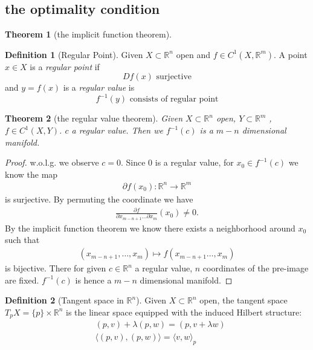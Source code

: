 \documentclass[a4paper,11pt,fleqn, draft]{book}
\newtheorem{theorem}{Theorem}[section]
\theoremstyle{definition}
\newtheorem{definition}{Definition}[section]
\theoremstyle{remark}
\begin{document}
\subsection{the optimality condition}
\begin{theorem}[the implicit function theorem]
\end{theorem}

\begin{definition}[Regular Point]
	Given $X \subset \mathbb{R}^n$ open and $f \in C^1 (X, \mathbb{R}^m)$. A point $x \in X$ is a \textit{regular point} if 
	\begin{equation*}
		D f(x)  \text{ surjective}
	\end{equation*}
	and $y = f(x)$ is a \textit{regular value} is 
	\begin{equation*}
		f^{-1}(y) \text{ consists of regular point}
	\end{equation*}
\end{definition}

\begin{theorem}[the regular value theorem]
	Given $X \subset \mathbb{R}^n$ open, $Y \subset \mathbb{R}^m$ , $f \in C^1(X, Y)$. $c$ a regular value. Then we $f^{-1}(c)$ is a $m - n$ dimensional manifold. 
\end{theorem}
\begin{proof}
	w.o.l.g. we observe $c = 0$. Since $0$ is a regular value, for $x_0 \in f^{-1}(c)$ we know the map
	\begin{align*}
		\partial f(x_0): \mathbb{R}^n \rightarrow \mathbb{R}^m
	\end{align*}
	is surjective. By permuting the coordinate we have 
	\begin{align*}
		\frac{\partial f}{\partial x_{m - n + 1} \dots \partial x_m}(x_0) \neq 0. 
	\end{align*}
	By the implicit function theorem we know there exists a neighborhood around $x_0$ such that
	\begin{align*}
		(x_{m - n + 1}, \dots, x_m) \mapsto f(x_{m-n+1} \dots, x_m)
	\end{align*}
	is bijective. There for given $c \in \mathbb{R}^n$ a regular value, $n$ coordinates of the pre-image are fixed. $f^{-1}(c)$ is hence a $m - n$ dimensional manifold. 
\end{proof}

\begin{definition}[Tangent space in $\mathbb{R}^n$]
	Given $X \subset \mathbb{R}^n$ open, the tangent space $T_pX = \{p\} \times \mathbb{R}^n$ is the linear space equipped with the induced Hilbert structure:
	\begin{equation*}
	\begin{aligned}
		& (p, v) + \lambda (p, w) = (p, v + \lambda w)\\
		& \langle(p, v), (p, w) \rangle = \langle v, w \rangle_p
	\end{aligned}
	\end{equation*} 
\end{definition}
\end{document}
